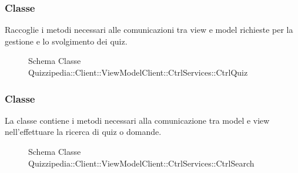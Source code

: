 \subsubsection{Classe }
Raccoglie i metodi necessari alle comunicazioni tra view e model richieste per la gestione e lo svolgimento dei quiz.
\begin{figure}[H]
\centering
\noindent{}
\caption[Schema Classe CtrlQuiz]{Schema Classe Quizzipedia::Client::ViewModelClient::CtrlServices::CtrlQuiz}
\end{figure}
\subsubsection{Classe }
La classe contiene i metodi necessari alla comunicazione tra model e view nell'effettuare la ricerca di quiz o domande.
\begin{figure}[H]
\centering
\noindent{}
\caption[Schema Classe CtrlSearch]{Schema Classe Quizzipedia::Client::ViewModelClient::CtrlServices::CtrlSearch}
\end{figure}
